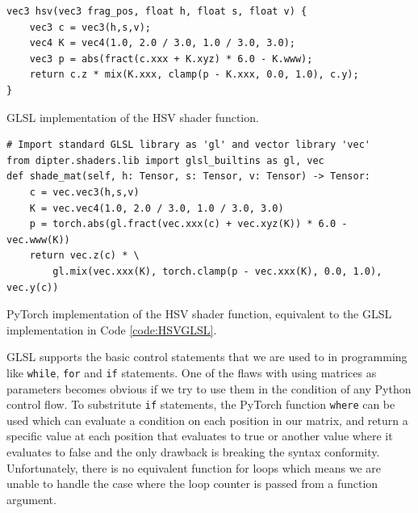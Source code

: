 \begin{codefig}
\begin{verbatim}
vec3 hsv(vec3 frag_pos, float h, float s, float v) {
    vec3 c = vec3(h,s,v);
    vec4 K = vec4(1.0, 2.0 / 3.0, 1.0 / 3.0, 3.0);
    vec3 p = abs(fract(c.xxx + K.xyz) * 6.0 - K.www);
    return c.z * mix(K.xxx, clamp(p - K.xxx, 0.0, 1.0), c.y);
}
\end{verbatim}
\caption{GLSL implementation of the HSV shader function.}
\label{code:HSVGLSL}
\end{codefig}

\begin{codefig}
\begin{verbatim}
# Import standard GLSL library as 'gl' and vector library 'vec'
from dipter.shaders.lib import glsl_builtins as gl, vec  
def shade_mat(self, h: Tensor, s: Tensor, v: Tensor) -> Tensor:
    c = vec.vec3(h,s,v)
    K = vec.vec4(1.0, 2.0 / 3.0, 1.0 / 3.0, 3.0)
    p = torch.abs(gl.fract(vec.xxx(c) + vec.xyz(K)) * 6.0 - vec.www(K))
    return vec.z(c) * \
        gl.mix(vec.xxx(K), torch.clamp(p - vec.xxx(K), 0.0, 1.0), vec.y(c))
\end{verbatim}
\caption{PyTorch implementation of the HSV shader function, equivalent to the GLSL implementation in Code \ref{code:HSVGLSL}.}
\label{code:HSVPyTorch}
\end{codefig}

GLSL supports the basic control statements that we are used to in programming like \texttt{while}, \texttt{for} and \texttt{if} statements. One of the flaws with using matrices as parameters becomes obvious if we try to use them in the condition of any Python control flow. To substritute \texttt{if} statements, the PyTorch function \texttt{where} can be used which can evaluate a condition on each position in our matrix, and return a specific value at each position that evaluates to true or another value where it evaluates to false and the only drawback is breaking the syntax conformity. Unfortunately, there is no equivalent function for loops which means we are unable to handle the case where the loop counter is passed from a function argument.

